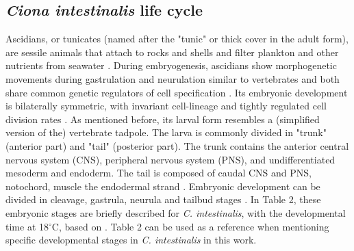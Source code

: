 \subsection{\textit{Ciona intestinalis} life cycle}


Ascidians, or tunicates (named after the "tunic" or thick cover in the adult form), are sessile animals that  attach to rocks and shells and filter plankton and other nutrients from seawater \citep{satoh2014developmental}.
During embryogenesis, ascidians show morphogenetic movements during gastrulation and neurulation similar to vertebrates and both share common genetic regulators of cell specification \citep{Satoh2003}. Its embryonic development is bilaterally symmetric, with invariant cell-lineage and tightly regulated cell division rates \citep{Stolfi2015}.
%
As mentioned before, its larval form resembles a (simplified version of the) vertebrate tadpole. The larva is commonly divided in "trunk" (anterior part) and "tail" (posterior part). The trunk contains the anterior central nervous system (CNS), peripheral nervous system (PNS), and undifferentiated mesoderm and endoderm. 
The tail is composed of caudal CNS and PNS, notochord, muscle the endodermal strand \citep{Stolfi2015}.
Embryonic development can be divided in cleavage, gastrula, neurula and tailbud stages \citep{Hotta2007}. In Table 2, these embryonic stages are briefly described for \textit{C. intestinalis}, with the developmental time at 18$^\circ$C, based on \citep{Hotta2007}. Table 2 can be used as a reference when mentioning specific developmental stages in \textit{C. intestinalis} in this work.

